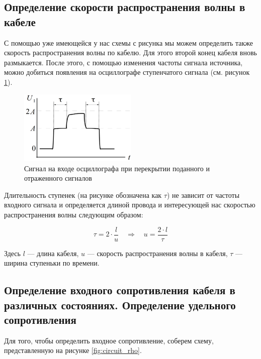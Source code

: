 \documentclass[a4paper, 12pt]{article}
\newcommand{\qrq}
{\ensuremath{\quad \Rightarrow \quad}} %
\begin{document}
\subsection{Определение скорости распространения волны в кабеле}

С помощью уже имеющейся у нас схемы с рисунка мы можем определить также скорость распространения волны по кабелю. Для этого второй конец кабеля вновь размыкается. После этого, с помощью изменения частоты сигнала источника, можно добиться появления на осциллографе ступенчатого сигнала (см. рисунок \ref{fig:t2theor}).

\begin{figure}[h!]
	\centering
	\includegraphics[width=0.5\textwidth]{Task_2_theor}        
	\caption{Сигнал на входе осциллографа при перекрытии поданного и отраженного сигналов}
	\label{fig:t2theor}
\end{figure}

Длительность ступенек (на рисунке обозначена как $\tau$) не зависит от частоты входного сигнала и определяется длиной провода и интересующей нас скоростью распространения волны следующим образом:

\begin{equation}
	\tau = 2\cdot \frac{l}{u} \qrq u =\frac{2\cdot l}{\tau}
	\label{eq:u}
\end{equation}

Здесь $l$ --- длина кабеля, $u$ --- скорость распространения волны в кабеля, $\tau$ --- ширина ступеньки по времени.

\subsection{Определение входного сопротивления кабеля в различных состояниях. Определение удельного сопротивления}

Для того, чтобы определить входное сопротивление, соберем схему, представленную на рисунке \ref{fig:circuit_rho}.
\end{document}
